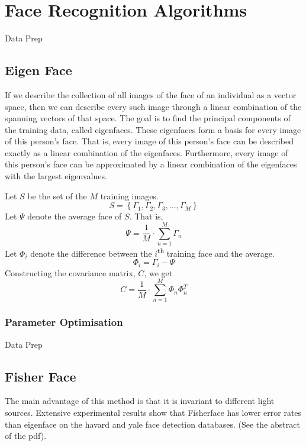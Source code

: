 \documentclass{article}
\begin{document}
\section{Face Recognition Algorithms}
Data Prep

\subsection{Eigen Face}
If we describe the collection of all images of the face of an individual as a vector space, then we can describe every such image through a linear combination of the spanning vectors of that space.
The goal is to find the principal components of the training data, called eigenfaces. These eigenfaces form a basis for every image of this person’s face. That is, every image of this person’s face can be described exactly as a linear combination of the eigenfaces. Furthermore, every image of this person’s face can be approximated by a linear combination of the eigenfaces with the largest eigenvalues.

\vspace{12pt} \noindent Let $S$ be the set of the $M$ training images.
\begin{equation}
	S = \left\{\Gamma_1, \Gamma_2, \Gamma_3, \ldots, \Gamma_M\right\}
\end{equation}
Let $\Psi$ denote the average face of $S$. That is,
\begin{equation}
	\Psi = \frac{1}{M}\cdot\sum_{n=1}^{M}\Gamma_n
\end{equation}
Let $\Phi_i$ denote the difference between the $i$\textsuperscript{th} training face and the average.
\begin{equation}
	\Phi_i = \Gamma_i - \Psi
\end{equation}
Constructing the covariance matrix, $C$, we get
\begin{equation}
	C = \frac{1}{M}\cdot\sum_{n=1}^{M}\Phi_n \Phi_n^T
\end{equation}

\subsubsection{Parameter Optimisation}
Data Prep

\subsection{Fisher Face}
The main advantage of this method is that it is invariant to different light sources. Extensive experimental results show that Fisherface has lower error rates than eigenface on the havard and yale face detection databases. (See the abstract of the pdf).
\end{document}
